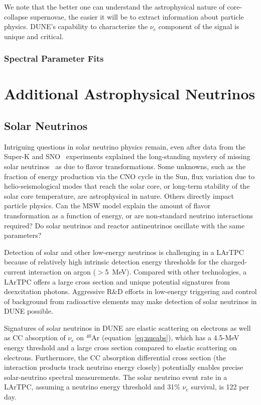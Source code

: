 We note that the better one can understand the astrophysical nature of core-collapse supernovae, the easier it will be to extract information about particle physics.  DUNE's capability to characterize the $\nu_e$ component of the signal is unique and critical.

\subsubsection{Spectral Parameter Fits}

\section{Additional Astrophysical Neutrinos}
\label{sec:physics-snblowe-other}

\subsection{Solar Neutrinos}

Intriguing questions in solar neutrino physics remain,
even after data
from the Super-K and SNO~\cite{Fukuda:2001nj,Ahmad:2001an}
experiments explained the long-standing mystery of missing solar
neutrinos~\cite{Cleveland:1998nv} as due to flavor
transformations. 
Some unknowns, such as the fraction of energy production via the CNO
cycle in the Sun, flux variation due to helio-seismological modes that
reach the solar core, or long-term stability of the solar core
temperature, are astrophysical in nature. Others directly impact
particle physics. Can the MSW model explain the amount of flavor
transformation as a function of energy, or are non-standard neutrino
interactions required?  Do solar neutrinos and reactor antineutrinos
oscillate with the same parameters? 

Detection of solar and other low-energy neutrinos is challenging in
a LArTPC because of relatively high intrinsic detection energy thresholds for
the charged-current interaction on argon ($>$\SI{5}{\MeV}). 
Compared with other technologies, a LArTPC offers a large
cross section and unique potential signatures from deexcitation
photons. Aggressive R\&D efforts in low-energy triggering and
control of background from radioactive elements may make detection
of solar neutrinos in DUNE possible.

Signatures of solar neutrinos in DUNE
are elastic scattering on electrons as well as CC absorption of $\nu_e$ on $^{40}$Ar (equation~\ref{eq:nueabs}), which has a 4.5-MeV energy threshold and a large cross section compared to elastic scattering on electrons.  Furthermore, the CC absorption differential cross section (the interaction products track neutrino energy closely) potentially enables precise solar-neutrino spectral measurements.
The solar neutrino event rate in a
 LArTPC, assuming a  neutrino energy
threshold and 31\% $\nu_e$ survival, is 122 per day.


